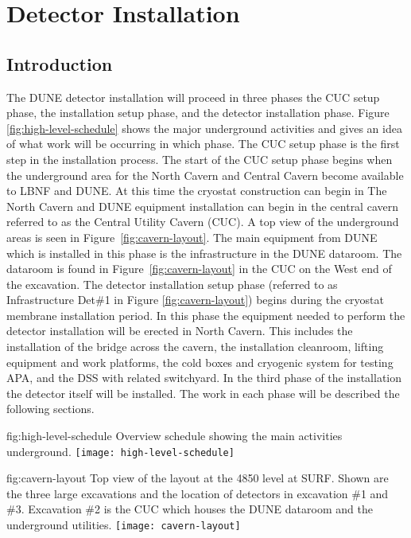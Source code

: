 \section{Detector Installation}
\label{sec:fdsp-tc-inst}

\subsection{Introduction}
\label{sec:fdsp-tc-inst-intro}

The DUNE detector installation will proceed in three phases the CUC setup phase, the installation setup phase, and the detector installation phase. Figure \ref{fig:high-level-schedule} 
shows the major underground activities and gives an idea of what work will be occurring in which phase. The CUC setup phase is the first step in the installation process. The start of the CUC setup phase begins when the underground area for the North Cavern and Central Cavern become available to LBNF and DUNE. At this time the cryostat construction can begin in The North Cavern and DUNE equipment installation can begin in the central cavern referred to as the Central Utility Cavern (CUC). A top view of the underground areas is seen in Figure~\ref{fig:cavern-layout}. The main equipment from DUNE which is installed in this phase is the infrastructure in the DUNE dataroom. The dataroom is found in Figure~\ref{fig:cavern-layout} in the CUC on the West end of the excavation. The detector installation setup phase (referred to as Infrastructure Det\#1 in Figure \ref{fig:cavern-layout}) begins during the cryostat membrane installation period. In this phase the equipment needed to perform the detector installation will be erected in North Cavern. This includes the installation of the bridge across the cavern, the installation cleanroom, lifting equipment and work platforms, the cold boxes and cryogenic system for testing APA, and the DSS with related switchyard. In the third phase of the installation the detector itself will be installed. The work in each phase will be described the following sections.

\begin{dunefigure}{fig:high-level-schedule}
  {Overview schedule showing the main activities underground.}
\texttt{[image: high-level-schedule]}
\end{dunefigure}

\begin{dunefigure}{fig:cavern-layout}
  {Top view of the layout at the 4850 level at SURF. Shown are the three large excavations and the location of detectors in excavation \#1 and \#3. Excavation \#2 is the CUC which houses the DUNE dataroom and the underground utilities.}
\texttt{[image: cavern-layout]}
\end{dunefigure}



